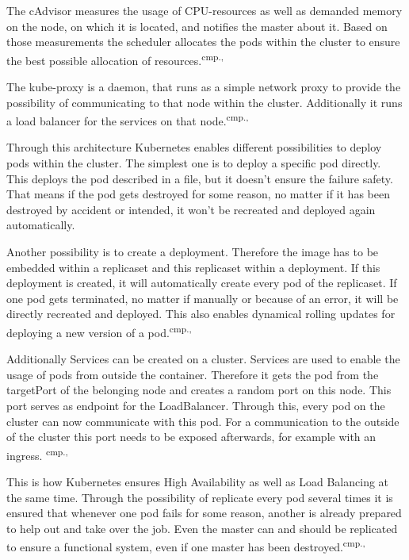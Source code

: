 The cAdvisor measures the usage of CPU-resources as well as demanded memory on the node, on which it is located, and notifies the master about it. Based on those measurements the scheduler allocates the pods within the cluster to ensure the best possible allocation of resources.\textsuperscript{cmp.\cite{13}, \cite{16}}

The kube-proxy is a daemon, that runs as a simple network proxy to provide the possibility of communicating to that node within the cluster. Additionally it runs a load balancer for the services on that node.\textsuperscript{cmp.\cite{13}, \cite{16}}

Through this architecture Kubernetes enables different possibilities to deploy pods within the cluster. The simplest one is to deploy a specific pod directly. This deploys the pod described in a file, but it doesn't ensure the failure safety. That means if the pod gets destroyed for some reason, no matter if it has been destroyed by accident or intended, it won't be recreated and deployed again automatically. 


Another possibility is to create a deployment. Therefore the image has to be embedded within a replicaset and this replicaset within a deployment. If this deployment is created, it will automatically create every pod of the replicaset. If one pod gets terminated, no matter if manually or because of an error, it will be directly recreated and deployed. This also enables dynamical rolling updates for deploying a new version of a pod.\textsuperscript{cmp.\cite{13}, \cite{18}}

Additionally Services can be created on a cluster. Services are used to enable the usage of pods from outside the container. Therefore it gets the pod from the targetPort of the belonging node and creates a random port on this node. This port serves as endpoint for the LoadBalancer. Through this, every pod on the cluster can now communicate with this pod. For a communication to the outside of the cluster this port needs to be exposed afterwards, for example with an ingress. \textsuperscript{cmp.\cite{13}, \cite{18}}

This is how Kubernetes ensures High Availability as well as Load Balancing at the same time. Through the possibility of replicate every pod several times it is ensured that whenever one pod fails for some reason, another is already prepared to help out and take over the job. Even the master can and should be replicated to ensure a functional system, even if one master has been destroyed.\textsuperscript{cmp.\cite{13}, \cite{18}}

